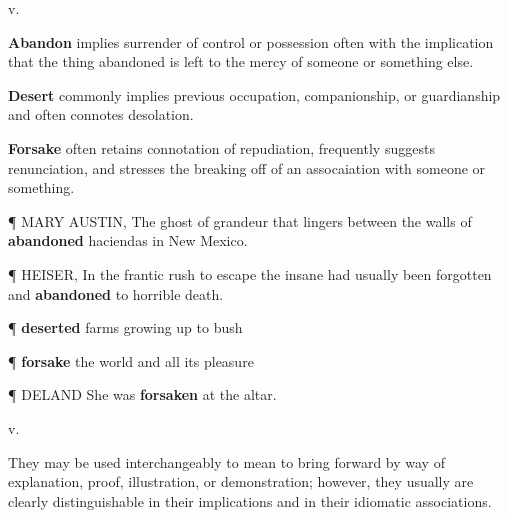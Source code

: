 
\leftmargini=7mm  %



\begin{description}[style=unboxed] %

 v.
\begin{mynewitemize}
\item \textbf{Abandon} implies surrender of control or possession often with the implication
  that the thing abandoned is left to the mercy of someone or something else.
\item \textbf{Desert} commonly implies previous occupation, companionship, or guardianship
  and often connotes desolation.
\item \textbf{Forsake} often retains connotation of repudiation, frequently
  suggests renunciation, and stresses the breaking off of an assocaiation with
  someone or something.
\item[\P] MARY AUSTIN, The ghost of grandeur that lingers between the walls of 
  \textbf{abandoned} haciendas in New Mexico. 
\item[\P] HEISER, In the frantic rush to escape the insane had usually been forgotten
  and \textbf{abandoned} to horrible death.
\item[\P] \textbf{deserted} farms growing up to bush
\item[\P] \textbf{forsake} the world and all its pleasure
\item[\P] DELAND She was \textbf{forsaken} at the altar.
\end{mynewitemize}

 v.

They may be used interchangeably to mean to bring forward by way of explanation, 
proof, illustration, or demonstration; however, they usually are clearly distinguishable 
in their implications and in their idiomatic associations.


\end{description}
